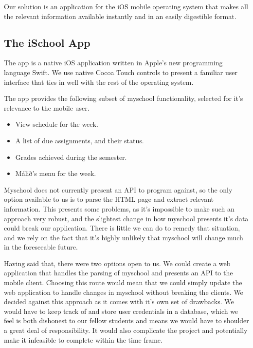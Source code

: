 \documentclass[DIV=calc, paper=a4, fontsize=11pt, twocolumn]{scrartcl}	 %
\begin{document}
Our solution is an application for the iOS mobile operating system that makes all the relevant 
information available instantly and in an easily digestible format.


\subsection*{The iSchool App}

The app is a native iOS application written in Apple's new programming language Swift.
We use native Cocoa Touch controls to present a familiar user interface that ties in well with
the rest of the operating system.

The app provides the following subset of myschool functionality, selected for it's relevance to
the mobile user.
\begin{itemize}
    \item View schedule for the week.
    \item A list of due assignments, and their status.
    \item Grades achieved during the semester.
    \item Málið's menu for the week.
\end{itemize}

Myschool does not currently present an API to program against, so the only option available to us
is to parse the HTML page and extract relevant information. This presents some problems, as it's 
impossible to make such an approach very robust, and the slightest change in how myschool presents
it's data could break our application. There is little we can do to remedy that situation, and we
rely on the fact that it's highly unlikely that myschool will change much in the foreseeable future.

Having said that, there were two options open to us. We could create a web application that handles
the parsing of myschool and presents an API to the mobile client. Choosing this route would mean that
we could simply update the web application to handle changes in myschool without breaking the 
clients. We decided against this approach as it comes with it's own set of drawbacks. We would have
to keep track of and store user credentials in a database, which we feel is both dishonest to our
fellow students and means we would have to shoulder a great deal of responsibility. It would also 
complicate the project and potentially make it infeasible to complete within the time frame.
\end{document}
